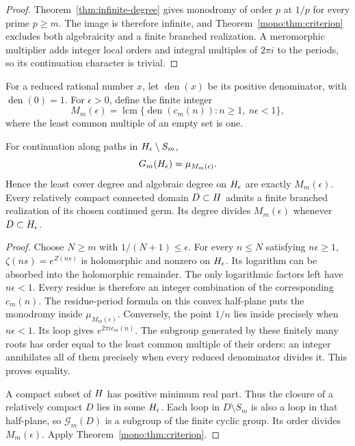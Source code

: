 \begin{proof}
Theorem~\ref{thm:infinite-degree} gives monodromy of order \(p\) at
\(1/p\) for every prime \(p\geq m\).  The image is therefore infinite,
and Theorem~\ref{mono:thm:criterion} excludes both algebraicity and a
finite branched realization.  A meromorphic multiplier adds integer
local orders and integral multiples of \(2\pi i\) to the periods,
so its continuation character is trivial.
\end{proof}

For a reduced rational number \(x\), let \(\operatorname{den}(x)\) be
its positive denominator, with \(\operatorname{den}(0)=1\).
For \(\epsilon>0\), define the finite integer
\[
 M_m(\epsilon)=\operatorname{lcm}
 \{\operatorname{den}(c_m(n)):n\geq1,\ n\epsilon<1\},
\]
where the least common multiple of an empty set is one.

\begin{theorem}
\label{mono:thm:halfplane}
For continuation along paths in \(H_\epsilon\setminus S_m\),
\[
 G_m(H_\epsilon)=\mu_{M_m(\epsilon)}.
\]
Hence the least cover degree and algebraic degree on \(H_\epsilon\)
are exactly \(M_m(\epsilon)\).
Every relatively compact connected domain \(D\subset H\) admits a
finite branched realization of its chosen continued germ.
Its degree divides \(M_m(\epsilon)\) whenever \(D\subset H_\epsilon\).
\end{theorem}

\begin{proof}
Choose \(N\geq m\) with \(1/(N+1)\leq\epsilon\).
For every \(n\leq N\) satisfying \(n\epsilon\geq1\),
\(\zeta(ns)=e^{Z(ns)}\) is holomorphic and nonzero on \(H_\epsilon\).
Its logarithm can be absorbed into the holomorphic remainder.
The only logarithmic factors left have \(n\epsilon<1\).
Every residue is therefore an integer combination of the corresponding
\(c_m(n)\).
The residue-period formula on this convex half-plane puts the monodromy
inside \(\mu_{M_m(\epsilon)}\).
Conversely, the point \(1/n\) lies inside precisely when \(n\epsilon<1\).
Its loop gives \(e^{2\pi i c_m(n)}\).
The subgroup generated by these finitely many roots has order equal to
the least common multiple of their orders: an integer annihilates all
of them precisely when every reduced denominator divides it.
This proves equality.

A compact subset of \(H\) has positive minimum real part.
Thus the closure of a relatively compact \(D\) lies in some
\(H_\epsilon\).  Each loop in \(D\setminus S_m\) is also a loop
in that half-plane, so \(\mathcal G_m(D)\) is a subgroup of the finite cyclic group.
Its order divides \(M_m(\epsilon)\).
Apply Theorem~\ref{mono:thm:criterion}.
\end{proof}

